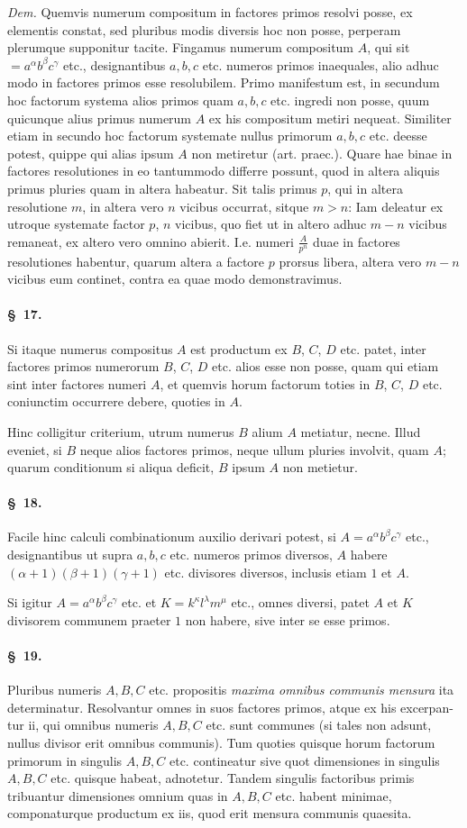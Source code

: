 \documentclass[12pt,a4paper]{article}
\theoremstyle{plain}
\theoremstyle{definition}
\theoremstyle{remark}
\newcommand{\art}[1]{\paragraph{\S\ #1.}}
\begin{document}
\emph{Dem.} Quemvis numerum compositum in factores primos resolvi posse, ex elementis constat, sed pluribus modis diversis hoc non posse, perperam plerumque supponitur tacite. Fingamus numerum compositum $A$, qui sit $= a^\alpha b^\beta c^\gamma$ etc., designantibus $a, b, c$ etc. numeros primos inaequales, alio adhuc modo in factores primos esse resolubilem. Primo manifestum est, in secundum hoc factorum systema alios primos quam $a, b, c$ etc. ingredi non posse, quum quicunque alius primus numerum $A$ ex his compositum metiri nequeat. Similiter etiam in secundo hoc factorum systemate nullus primorum $a, b, c$ etc. deesse potest, quippe qui alias ipsum $A$ non metiretur (art. praec.). Quare hae binae in factores resolutiones in eo tantummodo differre possunt, quod in altera aliquis primus pluries quam in altera habeatur. Sit talis primus $p$, qui in altera resolutione $m$, in altera vero $n$ vicibus occurrat, sitque $m > n$: Iam deleatur ex utroque systemate factor $p$, $n$ vicibus, quo fiet ut in altero adhuc $m-n$ vicibus remaneat, ex altero vero omnino abierit. I.e. numeri $\frac{A}{p^n}$ duae in factores resolutiones habentur, quarum altera a factore $p$ prorsus libera, altera vero $m-n$ vicibus eum continet, contra ea quae modo demonstravimus.

\art{17}
Si itaque numerus compositus $A$ est productum ex $B$, $C$, $D$ etc. patet, inter factores primos numerorum $B$, $C$, $D$ etc. alios esse non posse, quam qui etiam sint inter factores numeri $A$, et quemvis horum factorum toties in $B$, $C$, $D$ etc. coniunctim occurrere debere, quoties in $A$.

Hinc colligitur criterium, utrum numerus $B$ alium $A$ metiatur, necne. Illud eveniet, si $B$ neque alios factores primos, neque ullum pluries involvit, quam $A$; quarum conditionum si aliqua deficit, $B$ ipsum $A$ non metietur.

\art{18}
Facile hinc calculi combinationum auxilio derivari potest, si $A = a^\alpha b^\beta c^\gamma$ etc., designantibus ut supra $a, b, c$ etc. numeros primos diversos, $A$ habere $(\alpha+1)(\beta+1)(\gamma+1)$ etc. divisores diversos, inclusis etiam $1$ et $A$.

Si igitur $A = a^\alpha b^\beta c^\gamma$ etc. et $K = k^\kappa l^\lambda m^\mu$ etc., omnes diversi, patet $A$ et $K$ divisorem communem praeter $1$ non habere, sive inter se esse primos.

\art{19}
Pluribus numeris $A, B, C$ etc. propositis \emph{maxima omnibus communis mensura} ita determinatur. Resolvantur omnes in suos factores primos, atque ex his excerpan- tur ii, qui omnibus numeris $A, B, C$ etc. sunt communes (si tales non adsunt, nullus divisor erit omnibus communis). Tum quoties quisque horum factorum primorum in singulis $A, B, C$ etc. contineatur sive quot dimensiones in singulis $A, B, C$ etc. quisque habeat, adnotetur. Tandem singulis factoribus primis tribuantur dimensiones omnium quas in $A, B, C$ etc. habent minimae, componaturque productum ex iis, quod erit mensura communis quaesita.
\end{document}
